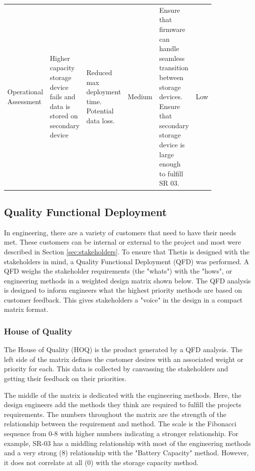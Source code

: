 \begin{landscape}
{\begin{longtable}{| p{0.12\linewidth} | p{0.16\linewidth} |  p{0.20\linewidth} | p{0.08\linewidth} | p{0.20\linewidth} | p{0.08\linewidth} |}
	\hline
	Operational \newline Assessment & Higher capacity storage device fails and data is stored on secondary device & Reduced max deployment time. \newline Potential data loss. & \cellcolor{yellow} Medium & Ensure that firmware can handle seamless transition between storage devices. \newline Ensure that secondary storage device is large enough to fulfill SR 03. & \cellcolor{green} Low
	\label{tab:sr11_feasibility}
\end{longtable}
}
\newpage

\end{landscape}

\subsection{Quality Functional Deployment} \label{ssec:qfd}
In engineering, there are a variety of customers that need to have their needs met.
These customers can be internal or external to the project and most were described in Section \ref{sec:stakeholders}.
To ensure that Thetis is designed with the stakeholders in mind, a Quality Functional Deployment (QFD) was performed.
A QFD weighs the stakeholder requirements (the "whats") with the "hows", or engineering methods in a weighted design matrix shown below.
The QFD analysis is designed to inform engineers what the highest priority methods are based on customer feedback.
This gives stakeholders a "voice" in the design in a compact matrix format.

\subsubsection{House of Quality} \label{sssec:hoq}
The House of Quality (HOQ) is the product generated by a QFD analysis.
The left side of the matrix defines the customer desires with an associated weight or priority for each.
This data is collected by canvassing the stakeholders and getting their feedback on their priorities.

The middle of the matrix is dedicated with the engineering methods.
Here, the design engineers add the methods they think are required to fulfill the projects requirements.
The numbers throughout the matrix are the strength of the relationship between the requirement and method. 
The scale is the Fibonacci sequence from 0-8 with higher numbers indicating a stronger relationship.
For example, SR-03 has a middling relationship with most of the engineering methods and a very strong (8) relationship with the "Battery Capacity" method.
However, it does not correlate at all (0) with the storage capacity method.

